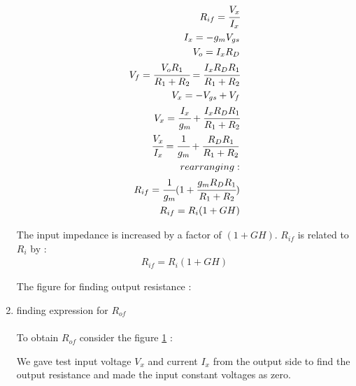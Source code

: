 \begin{enumerate}[label=\arabic*.,ref=\theenumi]
\begin{align}
R_{if} = \cfrac{V_{x}}{I_{x}}\\
I_{x} = -g_{m}V_{gs} \\
V_{o} = I_{x}R_{D}\\
V_{f} = \cfrac{V_{o}R_{1}}{R_{1}+R_{2}} = \cfrac{I_{x}R_{D}R_{1}}{R_{1}+R_{2}} \\
V_{x} = -V_{gs} + V_{f} \\
V_{x} = \cfrac{I_{x}}{g_{m}} + \cfrac{I_{x}R_{D}R_{1}}{R_{1}+R_{2}}\\
\cfrac{V_{x}}{I_{x}} =  \cfrac{1}{g_{m}} + \frac{R_{D}R_{1}}{R_{1}+R_{2}}\\
rearranging :\\
R_{if} =  \cfrac{1}{g_{m}}(1+\cfrac{g_{m}R_{D}R_{1}}{R_{1}+R_{2}})\\
R_{if} = R_{i}(1+GH)
\end{align}

The input impedance is increased by a factor of $(1+GH)$.
$R_{if}$ is related to $R_{i}$ by :\\
\begin{align}
R_{if} = R_{i}(1 + GH)
\end{align}




The figure for finding output resistance :

\begin{figure}[ht!]
	\begin{center}
		\resizebox{\columnwidth}{!}{}
	\end{center}
	\caption{}
	\label{fig:Small signal for finding output resistance}
\end{figure}

\item finding expression for $R_{of}$\\
\solution\\

To obtain $R_{of}$ consider the figure \ref{fig:Small signal for finding output resistance} :



We gave test input voltage $V_{x}$ and current $I_{x}$ from the output side to find the output resistance and made the input constant voltages as zero.


\end{enumerate}
